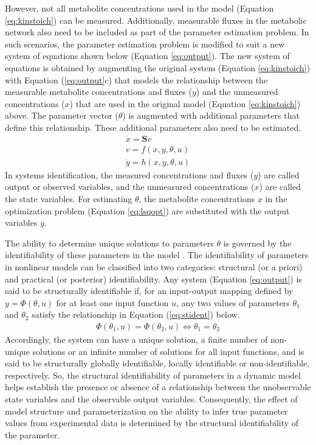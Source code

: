 \documentclass[10pt]{article}
\begin{document}
	However, not all metabolite concentrations used in the model (Equation \ref{eq:kinstoich}) can be measured. Additionally, measurable fluxes in the metabolic network also need to be included as part of the parameter estimation problem. In such scenarios, the parameter estimation problem is modified to suit a new system of equations shown below (Equation \ref{eq:output}). The new system of equations is obtained by augmenting the original system (Equation \ref{eq:kinstoich}) with Equation (\ref{eq:output}c) that models the relationship between the measurable metabolite concentrations and fluxes ($y$) and the unmeasured concentrations ($x$) that are used in the original model (Equation \ref{eq:kinstoich}) above. The parameter vector ($\theta$) is augmented with additional parameters that define this relationship. These additional parameters also need to be estimated.
	\begin{subequations}\label{eq:output}
		\begin{align}
		\dot{x} = \mathbf{S}v\\
		v = f(x, y, \theta, u)\\
		\dot{y} = h(x, y, \theta, u)
		\end{align}
	\end{subequations}
	In systems identification, the measured concentrations and fluxes ($y$) are called output or observed variables, and the unmeasured concentrations ($x$) are called the state variables. For estimating $\theta$, the metabolite concentrations $x$ in the optimization problem (Equation \ref{eq:lsqopt}) are substituted with the output variables $y$. 
	
	The ability to determine unique solutions to parameters $\theta$ is governed by the identifiability of these parameters in the model \parencite{McLean2012, Raue2009a}. The identifiability of parameters in nonlinear models can be classified into two categories: structural (or a priori) and practical (or posterior) identifiability. 	
	Any system (Equation \ref{eq:output}) is said to be structurally identifiable if, for an input-output mapping defined by $y = \Phi(\theta,u)$ for at least one input function $u$, any two values of parameters $\theta_1$ and $\theta_2$ satisfy the relationship in Equation (\ref{eq:stident}) below.
	\begin{align}\label{eq:stident}
	\Phi(\theta_1,u) = \Phi(\theta_2,u) \iff \theta_1 = \theta_2
	\end{align}
	Accordingly, the system can have a unique solution, a finite number of non-unique solutions or an infinite number of solutions for all input functions, and is said to be structurally globally identifiable, locally identifiable or non-identifiable, respectively. So, the structural identifiability of parameters in a dynamic model helps establish the presence or absence of a relationship between the unobservable state variables and the observable output variables. Consequently, the effect of model structure and parameterization on the ability to infer true parameter values from experimental data is determined by the structural identifiability of the parameter. 
	
\end{document}
